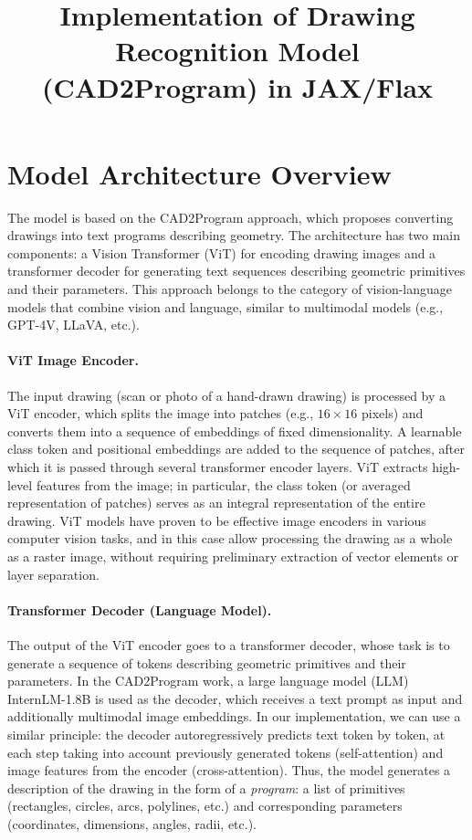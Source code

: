 \documentclass{article}
\begin{document}
\title{Implementation of Drawing Recognition Model (CAD2Program) in JAX/Flax}
\author{}
\date{}
\maketitle

\section{Model Architecture Overview}

The model is based on the CAD2Program approach, which proposes converting drawings into text programs describing geometry. The architecture has two main components: a Vision Transformer (ViT) for encoding drawing images and a transformer decoder for generating text sequences describing geometric primitives and their parameters. This approach belongs to the category of vision-language models that combine vision and language, similar to multimodal models (e.g., GPT-4V, LLaVA, etc.).

\paragraph{ViT Image Encoder.} The input drawing (scan or photo of a hand-drawn drawing) is processed by a ViT encoder, which splits the image into patches (e.g., $16\times16$ pixels) and converts them into a sequence of embeddings of fixed dimensionality. A learnable class token and positional embeddings are added to the sequence of patches, after which it is passed through several transformer encoder layers. ViT extracts high-level features from the image; in particular, the class token (or averaged representation of patches) serves as an integral representation of the entire drawing. ViT models have proven to be effective image encoders in various computer vision tasks, and in this case allow processing the drawing as a whole as a raster image, without requiring preliminary extraction of vector elements or layer separation.

\paragraph{Transformer Decoder (Language Model).} The output of the ViT encoder goes to a transformer decoder, whose task is to generate a sequence of tokens describing geometric primitives and their parameters. In the CAD2Program work, a large language model (LLM) InternLM-1.8B is used as the decoder, which receives a text prompt as input and additionally multimodal image embeddings. In our implementation, we can use a similar principle: the decoder autoregressively predicts text token by token, at each step taking into account previously generated tokens (self-attention) and image features from the encoder (cross-attention). Thus, the model generates a description of the drawing in the form of a \textit{program}: a list of primitives (rectangles, circles, arcs, polylines, etc.) and corresponding parameters (coordinates, dimensions, angles, radii, etc.).
\end{document}
